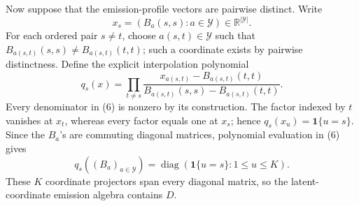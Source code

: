 Now suppose that the emission-profile vectors are pairwise distinct.  Write
\[
 x_s=(B_a(s,s):a\in\mathcal Y)\in\mathbb R^{|\mathcal Y|}.
\]
For each ordered pair \(s\neq t\), choose \(a(s,t)\in\mathcal Y\) such that \(B_{a(s,t)}(s,s)\neq B_{a(s,t)}(t,t)\); such a coordinate exists by pairwise distinctness.  Define the explicit interpolation polynomial
\[
 q_s(x)=\prod_{t\neq s}
 \frac{x_{a(s,t)}-B_{a(s,t)}(t,t)}
 {B_{a(s,t)}(s,s)-B_{a(s,t)}(t,t)}.                                             \tag{6}
\]
Every denominator in (6) is nonzero by its construction.  The factor indexed by \(t\) vanishes at \(x_t\), whereas every factor equals one at \(x_s\); hence \(q_s(x_u)=\mathbf 1\{u=s\}\).  Since the \(B_a\)'s are commuting diagonal matrices, polynomial evaluation in (6) gives
\[
 q_s((B_a)_{a\in\mathcal Y})=\operatorname{diag}(\mathbf 1\{u=s\}:1\leq u\leq K).
\]
These \(K\) coordinate projectors span every diagonal matrix, so the latent-coordinate emission algebra contains \(D\).


